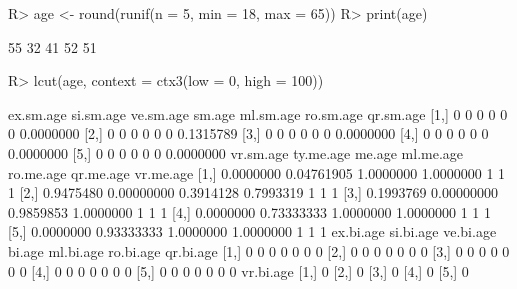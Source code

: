 \begin{Schunk}
% --begin: "lcut.numeric"
\begin{Sinput}
R> age <- round(runif(n = 5, min = 18, max = 65))
R> print(age)
\end{Sinput}
\begin{Soutput}
[1] 55 32 41 52 51
\end{Soutput}
\begin{Sinput}
R> lcut(age, context = ctx3(low = 0, high = 100))
\end{Sinput}
\begin{Soutput}
     ex.sm.age si.sm.age ve.sm.age sm.age ml.sm.age ro.sm.age qr.sm.age
[1,]         0         0         0      0         0         0 0.0000000
[2,]         0         0         0      0         0         0 0.1315789
[3,]         0         0         0      0         0         0 0.0000000
[4,]         0         0         0      0         0         0 0.0000000
[5,]         0         0         0      0         0         0 0.0000000
     vr.sm.age  ty.me.age    me.age ml.me.age ro.me.age qr.me.age vr.me.age
[1,] 0.0000000 0.04761905 1.0000000 1.0000000         1         1         1
[2,] 0.9475480 0.00000000 0.3914128 0.7993319         1         1         1
[3,] 0.1993769 0.00000000 0.9859853 1.0000000         1         1         1
[4,] 0.0000000 0.73333333 1.0000000 1.0000000         1         1         1
[5,] 0.0000000 0.93333333 1.0000000 1.0000000         1         1         1
     ex.bi.age si.bi.age ve.bi.age bi.age ml.bi.age ro.bi.age qr.bi.age
[1,]         0         0         0      0         0         0         0
[2,]         0         0         0      0         0         0         0
[3,]         0         0         0      0         0         0         0
[4,]         0         0         0      0         0         0         0
[5,]         0         0         0      0         0         0         0
     vr.bi.age
[1,]         0
[2,]         0
[3,]         0
[4,]         0
[5,]         0
\end{Soutput}
%
% --end: "lcut.numeric"
\end{Schunk}
